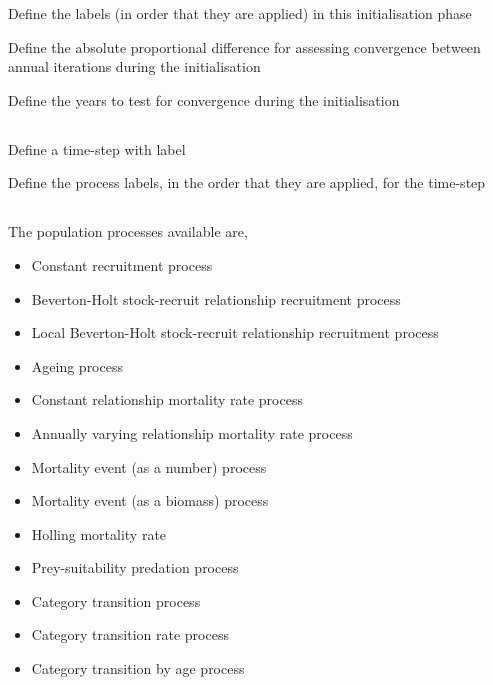  {Define the  labels (in order that they are applied) in this initialisation phase}

 {Define the absolute proportional difference for assessing convergence between annual iterations during the initialisation}

 {Define the years to test for convergence during the initialisation}

\subsection{}

 {Define a time-step with label}

 {Define the process labels, in the order that they are applied, for the time-step}

\subsection{}

The population processes available are,

\begin{itemize}
	\item Constant recruitment process
  \item Beverton-Holt stock-recruit relationship recruitment process
  \item Local Beverton-Holt stock-recruit relationship recruitment process
	\item Ageing process
	\item Constant relationship mortality rate process
	\item Annually varying relationship mortality rate process
	\item Mortality event (as a number) process
	\item Mortality event (as a biomass) process
	\item Holling mortality rate
	\item Prey-suitability predation process
	\item Category transition process
	\item Category transition rate process
	\item Category transition by age process
\end{itemize}

